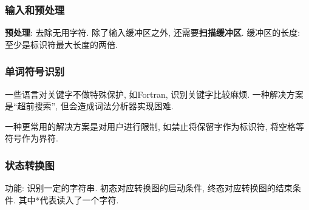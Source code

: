         \subsubsection{输入和预处理}

            \textbf{预处理}: 去除无用字符. 除了输入缓冲区之外, 还需要\textbf{扫描缓冲区}. 缓冲区的长度: 至少是标识符最大长度的两倍.

        \subsubsection{单词符号识别}

            一些语言对关键字不做特殊保护, 如Fortran, 识别关键字比较麻烦. 一种解决方案是``超前搜索'', 但会造成词法分析器实现困难. 

            一种更常用的解决方案是对用户进行限制, 如禁止将保留字作为标识符, 将空格等符号作为界符.

        \subsubsection{状态转换图}

            功能: 识别一定的字符串. 初态对应转换图的启动条件, 终态对应转换图的结束条件. 其中*代表读入了一个字符.
